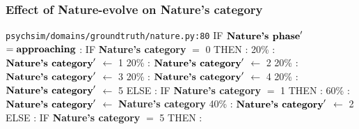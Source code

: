 \documentclass{article}%
\begin{document}
\subsubsection{Effect of Nature{-}evolve on Nature's category}%
\label{ssubsec:Effect of Nature{-}evolve on Nature's category}%
\begin{flushleft}%
\verb|psychsim/domains/groundtruth/nature.py:80|%
\linebreak%
IF %
$\mbox{\textbf{Nature's phase}} '$%
\linebreak%
\hspace*{2em}%
$= \mbox{\textbf{approaching}}$%
: %
IF %
\textbf{Nature's category}%
$=$%
0%
\linebreak%
\hspace*{4em}%
THEN %
: %
\linebreak%
\hspace*{6em}%
20\%%
: %
$\mbox{\textbf{Nature's category}} '$%
$\leftarrow$%
1%
\linebreak%
\hspace*{6em}%
20\%%
: %
$\mbox{\textbf{Nature's category}} '$%
$\leftarrow$%
2%
\linebreak%
\hspace*{6em}%
20\%%
: %
$\mbox{\textbf{Nature's category}} '$%
$\leftarrow$%
3%
\linebreak%
\hspace*{6em}%
20\%%
: %
$\mbox{\textbf{Nature's category}} '$%
$\leftarrow$%
4%
\linebreak%
\hspace*{6em}%
20\%%
: %
$\mbox{\textbf{Nature's category}} '$%
$\leftarrow$%
5%
\linebreak%
\hspace*{4em}%
ELSE %
: %
IF %
\textbf{Nature's category}%
$=$%
1%
\linebreak%
\hspace*{6em}%
THEN %
: %
\linebreak%
\hspace*{8em}%
60\%%
: %
$\mbox{\textbf{Nature's category}} '$%
$\leftarrow$%
\textbf{Nature's category}%
\linebreak%
\hspace*{8em}%
40\%%
: %
$\mbox{\textbf{Nature's category}} '$%
$\leftarrow$%
2%
\linebreak%
\hspace*{6em}%
ELSE %
: %
IF %
\textbf{Nature's category}%
$=$%
5%
\linebreak%
\hspace*{8em}%
THEN %
: %
\linebreak%

\end{flushleft}
\end{document}
